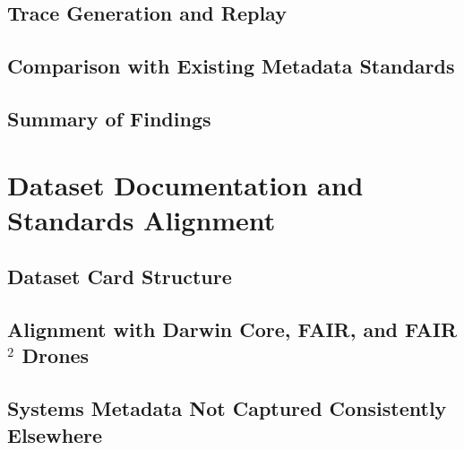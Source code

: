 \documentclass[manuscript]{acmart}
\begin{document}

\subsection{Trace Generation and Replay}


\subsection{Comparison with Existing Metadata Standards}

%

\subsection{Summary of Findings}


\newpage
\section{Dataset Documentation and Standards Alignment}
\label{sec:documentation}


\subsection{Dataset Card Structure}

\subsection{Alignment with Darwin Core, FAIR, and FAIR$^2$ Drones}

\subsection{Systems Metadata Not Captured Consistently Elsewhere}
\end{document}
